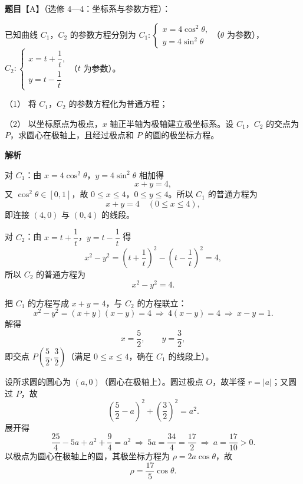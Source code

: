 \begin{answer}

\textbf{题目}【A】（选修 4—4：坐标系与参数方程）：

已知曲线 $C_1$，$C_2$ 的参数方程分别为 $C_1:\begin{cases}x=4\cos^2\theta,\\y=4\sin^2\theta\end{cases}$（$\theta$ 为参数），$C_2:\begin{cases}x=t+\dfrac1t,\\y=t-\dfrac1t\end{cases}$（$t$ 为参数）。

（1） 将 $C_1$，$C_2$ 的参数方程化为普通方程；

（2） 以坐标原点为极点，$x$ 轴正半轴为极轴建立极坐标系。设 $C_1$，$C_2$ 的交点为 $P$，求圆心在极轴上，且经过极点和 $P$ 的圆的极坐标方程。

\textbf{解析}


对 $C_1$：由 $x=4\cos^2\theta$，$y=4\sin^2\theta$ 相加得
\nopagebreak[4]
\[x+y=4,\]
又 $\cos^2\theta\in[0,1]$，故 $0\leqslant x\leqslant4$，$0\leqslant y\leqslant4$。所以 $C_1$ 的普通方程为
\nopagebreak[4]
\[x+y=4\quad(0\leqslant x\leqslant4),\]
即连接 $(4,0)$ 与 $(0,4)$ 的线段。

对 $C_2$：由 $x=t+\dfrac1t$，$y=t-\dfrac1t$ 得
\nopagebreak[4]
\[x^2-y^2=\left(t+\frac1t\right)^2-\left(t-\frac1t\right)^2=4,\]
所以 $C_2$ 的普通方程为
\nopagebreak[4]
\[x^2-y^2=4 .\]


把 $C_1$ 的方程写成 $x+y=4$，与 $C_2$ 的方程联立：
\nopagebreak[4]
\[x^2-y^2=(x+y)(x-y)=4\ \Longrightarrow\ 4(x-y)=4\ \Longrightarrow\ x-y=1 .\]
解得
\nopagebreak[4]
\[x=\frac52,\qquad y=\frac32,\]
即交点 $P\left(\dfrac52,\dfrac32\right)$（满足 $0\leqslant x\leqslant4$，确在 $C_1$ 的线段上）。

设所求圆的圆心为 $(a,0)$（圆心在极轴上）。圆过极点 $O$，故半径 $r=|a|$；又圆过 $P$，故
\nopagebreak[4]
\[\left(\frac52-a\right)^2+\left(\frac32\right)^2=a^2 .\]
展开得
\nopagebreak[4]
\[\frac{25}4-5a+a^2+\frac94=a^2\ \Longrightarrow\ 5a=\frac{34}4=\frac{17}2\ \Longrightarrow\ a=\frac{17}{10}>0 .\]
以极点为圆心在极轴上的圆，其极坐标方程为 $\rho=2a\cos\theta$，故
\nopagebreak[4]
\[\rho=\frac{17}5\cos\theta .\]



\end{answer}
